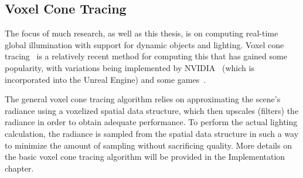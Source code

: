 \subsection{Voxel Cone Tracing}
The focus of much research, as well as this thesis, is on computing real-time global illumination with support for dynamic objects and lighting. Voxel cone tracing~\cite{crassin2011interactive} is a relatively recent method for computing this that has gained some popularity, with variations being implemented by NVIDIA~\cite{nvidiavxgi} (which is incorporated into the Unreal Engine) and some games~\cite{mclaren2016cascaded}.

The general voxel cone tracing algorithm relies on approximating the scene's radiance using a voxelized spatial data structure, which then upscales (filters) the radiance in order to obtain adequate performance. To perform the actual lighting calculation, the radiance is sampled from the spatial data structure in such a way to minimize the amount of sampling without sacrificing quality. More details on the basic voxel cone tracing algorithm will be provided in the Implementation chapter.
\fi
